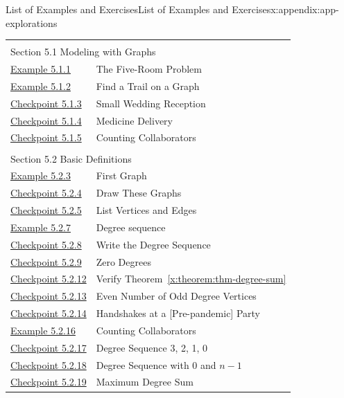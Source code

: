 \documentclass[oneside,10pt,]{book}
\newcommand{\xreffont}{\relax}
\numberwithin{equation}{section}
\begin{document}
\begin{appendixptx}{List of Examples and Exercises}{}{List of Examples and Exercises}{}{}{x:appendix:app-explorations}
\begin{longtable}[l]{ll}
\multicolumn{2}{l}{\null}\\[1.5ex] \multicolumn{2}{l}{\large Section 5.1 Modeling with Graphs}\\[0.5ex]
\hyperref[x:example:eg-graph-model-room]{Example 5.1.1}& The Five-Room Problem\\
\hyperref[x:example:eg-graph-model-eulerian]{Example 5.1.2}& Find a Trail on a Graph\\
\hyperref[x:exercise:ex-graph-g8]{Checkpoint 5.1.3}& Small Wedding Reception\\
\hyperref[x:exercise:ex-graph-herbs]{Checkpoint 5.1.4}& Medicine Delivery\\
\hyperref[x:exercise:ex-graph-coauthors]{Checkpoint 5.1.5}& Counting Collaborators\\
\multicolumn{2}{l}{\null}\\[1.5ex] \multicolumn{2}{l}{\large Section 5.2 Basic Definitions}\\[0.5ex]
\hyperref[x:example:eg-graph-first]{Example 5.2.3}& First Graph\\
\hyperref[x:exercise:ex-graph-first-draw]{Checkpoint 5.2.4}& Draw These Graphs\\
\hyperref[x:exercise:ex-graph-first-list]{Checkpoint 5.2.5}& List Vertices and Edges\\
\hyperref[x:example:eg-graph-degree]{Example 5.2.7}& Degree sequence\\
\hyperref[x:exercise:ex-graph-degree]{Checkpoint 5.2.8}& Write the Degree Sequence\\
\hyperref[x:exercise:ex-graph-degree-zero]{Checkpoint 5.2.9}& Zero Degrees\\
\hyperref[x:exercise:ex-graph-degsum]{Checkpoint 5.2.12}& Verify Theorem~{\xreffont\ref*{x:theorem:thm-degree-sum}}\\
\hyperref[x:exercise:ex-graph-handshake]{Checkpoint 5.2.13}& Even Number of Odd Degree Vertices\\
\hyperref[x:exercise:ex-graph-handshake-lemma]{Checkpoint 5.2.14}& Handshakes at a [Pre-pandemic] Party\\
\hyperref[x:example:eg-graph-coauthors-answer]{Example 5.2.16}& Counting Collaborators\\
\hyperref[x:exercise:ex-graph-degree-0-4]{Checkpoint 5.2.17}& Degree Sequence 3, 2, 1, 0\\
\hyperref[x:exercise:ex-graph-degree-0-n-1]{Checkpoint 5.2.18}& Degree Sequence with 0 and \(n-1\)\\
\hyperref[x:exercise:ex-graph-degree-sum-max]{Checkpoint 5.2.19}& Maximum Degree Sum\\

\end{longtable}
\end{appendixptx}
\end{document}
